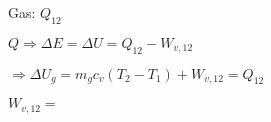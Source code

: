 Gas: \( Q_{12} \)  

\( Q \Rightarrow \Delta E = \Delta U = Q_{12} - W_{v,12} \)  

\( \Rightarrow \Delta U_g = m_g c_v (T_2 - T_1) + W_{v,12} = Q_{12} \)  

\( W_{v,12} = \)